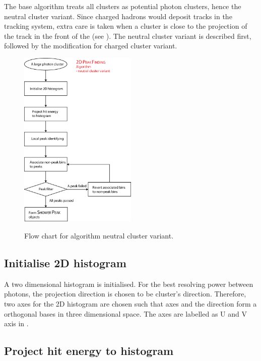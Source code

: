 The base algorithm treats all clusters as potential photon clusters, hence the neutral cluster variant. Since charged hadrons would deposit tracks in the tracking system, extra care is taken when a cluster is close to the projection of the track in the front of the \ECAL (see ). The neutral cluster variant is described first, followed by the modification for charged cluster variant.

\begin{figure}[tbph]
\centering
{\includegraphics[width=0.5\textwidth]{photon/2DpeakFinding}}
\caption[Flow chart for \peakFinding algorithm neutral cluster variant.]
{Flow chart for \peakFinding algorithm neutral cluster variant.}
\label{fig:photonPeakFindingFlowNeutral}
\end{figure}

\subsection{Initialise 2D histogram}

A two dimensional histogram is initialised. For the best resolving power between photons, the projection direction is chosen to be cluster's direction. Therefore, two axes for the 2D histogram are chosen such that axes and the direction form a orthogonal bases in three dimensional space. The axes are labelled as  U and V axis in .



\subsection{Project hit energy to histogram}

